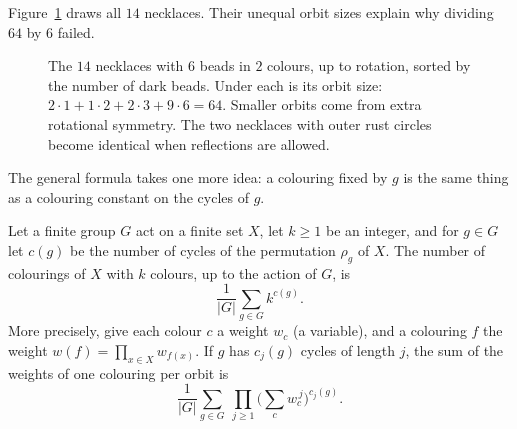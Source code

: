 Figure~\ref{fig:necklaces} draws all $14$ necklaces. Their unequal orbit sizes explain why dividing $64$ by $6$ failed.

\begin{figure}[ht]
\centering
{}
\caption{The $14$ necklaces with $6$ beads in $2$ colours, up to rotation, sorted by the number of dark beads. Under each is its orbit size: $2\cdot1+1\cdot2+2\cdot3+9\cdot6=64$. Smaller orbits come from extra rotational symmetry. The two necklaces with outer rust circles become identical when reflections are allowed.}
\label{fig:necklaces}
\end{figure}

The general formula takes one more idea: a colouring fixed by $g$ is the same thing as a colouring constant on the cycles of $g$.

\begin{theorem}\label{thm:polya}
Let a finite group $G$ act on a finite set $X$, let $k\ge1$ be an integer, and for $g\in G$ let $c(g)$ be the number of cycles of the permutation $\rho_g$ of $X$. The number of colourings of $X$ with $k$ colours, up to the action of $G$, is
\[
\frac1{|G|}\sum_{g\in G}k^{c(g)}.
\]
More precisely, give each colour $c$ a weight $w_c$ (a variable), and a colouring $f$ the weight $w(f)=\prod_{x\in X}w_{f(x)}$. If $g$ has $c_j(g)$ cycles of length $j$, the sum of the weights of one colouring per orbit is
\[
\frac1{|G|}\sum_{g\in G}\ \prod_{j\ge1}\Big(\sum_{c}w_c^{\,j}\Big)^{c_j(g)}.
\]
\end{theorem}
